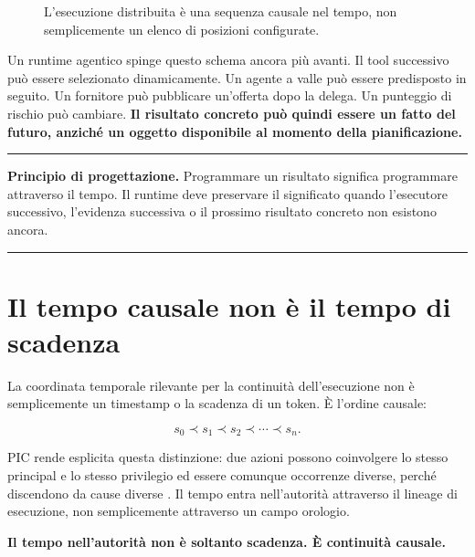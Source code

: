 \documentclass[10pt,oneside,openany]{book}
\newcommand{\principle}[1]{%
  \vspace{4pt}
  \noindent\begin{minipage}{\linewidth}
  \hrule\vspace{5pt}
  \small\sffamily\raggedright\textbf{Principio di progettazione.} #1
  \vspace{5pt}\hrule
  \end{minipage}\vspace{4pt}
}
\begin{document}
\begin{figure}[ht]
\centering
{}
\caption{L'esecuzione distribuita è una sequenza causale nel tempo, non semplicemente un elenco di posizioni configurate.}
\end{figure}

Un runtime agentico spinge questo schema ancora più avanti. Il tool successivo può essere selezionato dinamicamente. Un agente a valle può essere predisposto in seguito. Un fornitore può pubblicare un'offerta dopo la delega. Un punteggio di rischio può cambiare. \textbf{Il risultato concreto può quindi essere un fatto del futuro, anziché un oggetto disponibile al momento della pianificazione.}

\principle{Programmare un risultato significa programmare attraverso il tempo. Il runtime deve preservare il significato quando l'esecutore successivo, l'evidenza successiva o il prossimo risultato concreto non esistono ancora.}

\section{Il tempo causale non è il tempo di scadenza}
La coordinata temporale rilevante per la continuità dell'esecuzione non è semplicemente un timestamp o la scadenza di un token. È l'ordine causale:

\[
s_0 \prec s_1 \prec s_2 \prec \cdots \prec s_n.
\]

PIC rende esplicita questa distinzione: due azioni possono coinvolgere lo stesso principal e lo stesso privilegio ed essere comunque occorrenze diverse, perché discendono da cause diverse \cite{gallo2026pic}. Il tempo entra nell'autorità attraverso il lineage di esecuzione, non semplicemente attraverso un campo orologio.

\begin{center}
\sffamily\bfseries
Il tempo nell'autorità non è soltanto scadenza. È continuità causale.
\end{center}
\end{document}
